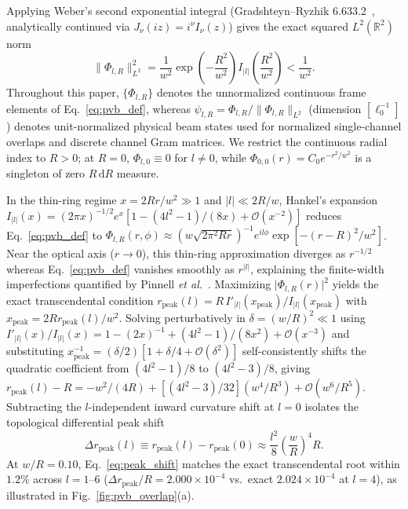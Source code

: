 \documentclass{optica-article}
\newcommand{\norm}[1]{\lVert #1 \rVert}
\newcommand{\abs}[1]{\lvert #1 \rvert}
\newcommand{\dd}{\mathrm{d}}
\begin{document}
Applying Weber's second exponential integral (Gradshteyn--Ryzhik 6.633.2~\cite{Gradshteyn2014}, analytically continued via $J_\nu(iz) = i^\nu I_\nu(z)$) gives the exact squared $L^2(\mathbb{R}^2)$ norm
\begin{equation}
  \norm{\Phi_{l,R}}_{L^2}^2 = \frac{1}{w^2}\exp\!\left(-\frac{R^2}{w^2}\right) I_{\abs{l}}\!\left(\frac{R^2}{w^2}\right) < \frac{1}{w^2}.
  \label{eq:pvb_norm}
\end{equation}
Throughout this paper, $\{\Phi_{l,R}\}$ denotes the unnormalized continuous frame elements of Eq.~\eqref{eq:pvb_def}, whereas $\psi_{l,R} = \Phi_{l,R}/\norm{\Phi_{l,R}}_{L^2}$ (dimension $[\ell_0^{-1}]$) denotes unit-normalized physical beam states used for normalized single-channel overlaps and discrete channel Gram matrices. We restrict the continuous radial index to $R > 0$; at $R = 0$, $\Phi_{l,0} \equiv 0$ for $l \neq 0$, while $\Phi_{0,0}(r) = C_0 e^{-r^2/w^2}$ is a singleton of zero $R\,\dd R$ measure.

In the thin-ring regime $x = 2Rr/w^2 \gg 1$ and $\abs{l} \ll 2R/w$, Hankel's expansion $I_{\abs{l}}(x) = (2\pi x)^{-1/2} e^x [1 - (4l^2-1)/(8x) + \mathcal{O}(x^{-2})]$ reduces Eq.~\eqref{eq:pvb_def} to $\Phi_{l,R}(r,\phi) \approx \allowbreak (w\sqrt{2\pi^2 Rr})^{-1} e^{il\phi} \allowbreak \exp[-(r-R)^2/w^2]$. Near the optical axis ($r \to 0$), this thin-ring approximation diverges as $r^{-1/2}$ whereas Eq.~\eqref{eq:pvb_def} vanishes smoothly as $r^{\abs{l}}$, explaining the finite-width imperfections quantified by Pinnell \emph{et al.}~\cite{Pinnell2019HowPerfect}. Maximizing $\abs{\Phi_{l,R}(r)}^2$ yields the exact transcendental condition $r_{\mathrm{peak}}(l) = R\,I'_{\abs{l}}(x_{\mathrm{peak}})/I_{\abs{l}}(x_{\mathrm{peak}})$ with $x_{\mathrm{peak}} = 2R r_{\mathrm{peak}}(l)/w^2$. Solving perturbatively in $\delta = (w/R)^2 \ll 1$ using $I'_{\abs{l}}(x)/I_{\abs{l}}(x) = 1 - (2x)^{-1} + (4l^2-1)/(8x^2) + \mathcal{O}(x^{-3})$ and substituting $x_{\mathrm{peak}}^{-1} = (\delta/2)[1 + \delta/4 + \mathcal{O}(\delta^2)]$ self-consistently shifts the quadratic coefficient from $(4l^2-1)/8$ to $(4l^2-3)/8$, giving $r_{\mathrm{peak}}(l) - R = -w^2/(4R) + [(4l^2-3)/32](w^4/R^3) + \mathcal{O}(w^6/R^5)$. Subtracting the $l$-independent inward curvature shift at $l = 0$ isolates the topological differential peak shift
\begin{equation}
  \Delta r_{\mathrm{peak}}(l) \equiv r_{\mathrm{peak}}(l) - r_{\mathrm{peak}}(0) \approx \frac{l^2}{8}\left(\frac{w}{R}\right)^4 R.
  \label{eq:peak_shift}
\end{equation}
At $w/R = 0.10$, Eq.~\eqref{eq:peak_shift} matches the exact transcendental root within $1.2\%$ across $l = 1\text{--}6$ ($\Delta r_{\mathrm{peak}}/R = 2.000\times 10^{-4}$ vs.\ exact $2.024\times 10^{-4}$ at $l = 4$), as illustrated in Fig.~\ref{fig:pvb_overlap}(a).
\end{document}
